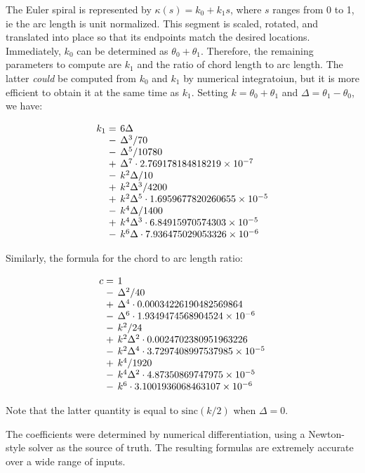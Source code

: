 \documentclass[sigconf, authordraft]{acmart}
\begin{document}
The Euler spiral is represented by $\kappa(s) = k_0 + k_1s$, where $s$ ranges from 0 to 1, ie the arc length is unit normalized. This segment is scaled, rotated, and translated into place so that its endpoints match the desired locations. Immediately, $k_0$ can be determined as $\theta_0 + \theta_1$. Therefore, the remaining parameters to compute are $k_1$ and the ratio of chord length to arc length. The latter \emph{could} be computed from $k_0$ and $k_1$ by numerical integratoiun, but it is more efficient to obtain it at the same time as $k_1$. Setting $k = \theta_0 + \theta_1$ and $\Delta = \theta_1 - \theta_0$, we have:

\[
    \setlength\arraycolsep{2pt}
    \begin{array}{rl}
    k_1 = & 6\Delta \\
     - & \Delta^3 / 70 \\
     - & \Delta^5 / 10780 \\
     + & \Delta^7 \cdot 2.769178184818219\times 10^{-7} \\
     - & k^2\Delta / 10 \\
     + & k^2\Delta^3 / 4200 \\
     + & k^2\Delta^5 \cdot 1.6959677820260655\times 10^{-5} \\
     - & k^4\Delta / 1400 \\
     + & k^4\Delta^3 \cdot 6.84915970574303\times 10^{-5} \\
     - & k^6\Delta \cdot 7.936475029053326\times 10^{-6}
    \end{array}
\]

Similarly, the formula for the chord to arc length ratio:

\[
    \setlength\arraycolsep{2pt}
    \begin{array}{rl}
    c = & 1 \\
    - & \Delta^2 / 40 \\
    + & \Delta^4 \cdot 0.00034226190482569864 \\
    - & \Delta^6 \cdot 1.9349474568904524\times 10^{-6} \\
    - & k^2 / 24 \\
    + & k^2\Delta^2 \cdot 0.0024702380951963226 \\
    - & k^2\Delta^4 \cdot 3.7297408997537985\times 10^{-5} \\
    + & k^4 / 1920 \\
    - & k^4\Delta^2 \cdot 4.87350869747975\times 10^{-5} \\
    - & k^6 \cdot 3.1001936068463107\times 10^{-6}
    \end{array}
\]

Note that the latter quantity is equal to $\mbox{sinc}(k/2)$ when $\Delta = 0$.

The coefficients were determined by numerical differentiation, using a Newton-style solver as the source of truth. The resulting formulas are extremely accurate over a wide range of inputs.

\end{document}
